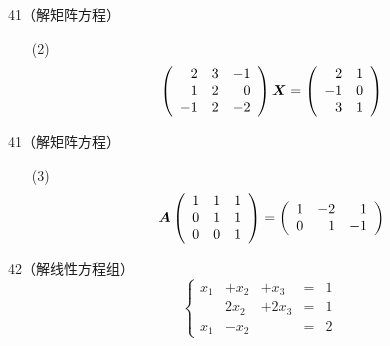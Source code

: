 \begin{frame}
  \begin{footnotesize}
    \begin{li}{41（解矩阵方程）}
      \begin{itemize}
      \item[(2)]
        $$
        \left(
        \begin{array}{rrr}
          2&3&-1\\
          1&2&0\\
          -1&2&-2
        \end{array}
        \right)\boldsymbol{X}=
        \left(
        \begin{array}{rr}
          2&1\\
          -1&0\\
          3&1
        \end{array}
        \right)        
        $$
      \end{itemize}
    \end{li}
  \end{footnotesize}
\end{frame}

\begin{frame}
  \begin{footnotesize}
    \begin{li}{41（解矩阵方程）}
      \begin{itemize}
      \item[(3)]
        $$
        \boldsymbol{A}\left(
        \begin{array}{rrr}
          1&1&1\\
          0&1&1\\
          0&0&1
        \end{array}
        \right)=
        \left(
        \begin{array}{rrr}
          1&-2&1\\
          0&1&-1
        \end{array}
        \right)        
        $$
      \end{itemize}
    \end{li}
  \end{footnotesize}
\end{frame}


\begin{frame}
  \begin{footnotesize}
    \begin{li}{42（解线性方程组）}     
      $$
      \left\{
      \begin{array}{rrrcr}
        x_1&+x_2&+x_3&=&1\\
           &2x_2&+2x_3&=&1\\
        x_1&-x_2&&=&2
      \end{array}
      \right.
      $$
    \end{li}
  \end{footnotesize}
\end{frame}



